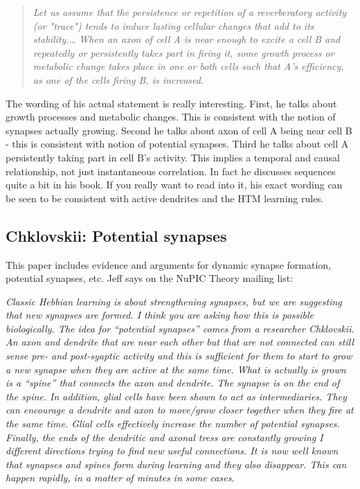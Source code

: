 \documentclass{article} %
\begin{document}
\begin{quote}
\emph{Let us assume that the persistence or repetition of a reverberatory
activity (or "trace") tends to induce lasting cellular changes that add to its
stability.… When an axon of cell A is near enough to excite a cell B and
repeatedly or persistently takes part in firing it, some growth process or
metabolic change takes place in one or both cells such that A's efficiency, as
one of the cells firing B, is increased.}
\end{quote}

The wording of his actual statement is really interesting. First, he
talks about growth processes and metabolic changes. This is consistent with the
notion of synapses actually growing.  Second he talks about axon of cell A being
near cell B - this is consistent with notion of potential synapses.  Third he
talks about cell A persistently taking part in cell B’s activity. This implies a
temporal and causal relationship, not just instantaneous correlation. In fact
he discusses sequences quite a bit in his book. If  you  really  want to read
into it, his exact wording can be seen to be consistent with active dendrites
and the HTM learning rules.

\subsection{Chklovskii: Potential synapses}

This paper \cite{Chklovskii2004} includes evidence and arguments for dynamic
synapse formation,  potential synapses, etc. Jeff says on the NuPIC Theory
mailing list:

\emph{Classic Hebbian learning is about strengthening synapses, but we are
suggesting that new synapses are formed. I think you are asking how this is
possible biologically. The idea for “potential synapses” comes from a researcher
Chklovskii.  An axon and dendrite that are near each other but that are not
connected can still sense pre- and post-syaptic activity and this is sufficient
for them to start to grow a new synapse when they are active at the same time.
What is actually is grown is a “spine” that connects the axon and dendrite.  The
synapse is on the end of the spine.  In addition, glial cells have been shown to
act as intermediaries.  They can encourage a dendrite and axon to move/grow
closer together when they fire at the same time.  Glial cells effectively
increase the number of potential synapses.  Finally, the ends of the dendritic
and axonal tress are constantly growing I different directions trying to find
new useful connections.  It is now well known that synapses and spines form
during learning and they also disappear.  This can happen rapidly, in a matter
of minutes in some cases.}
\end{document}
